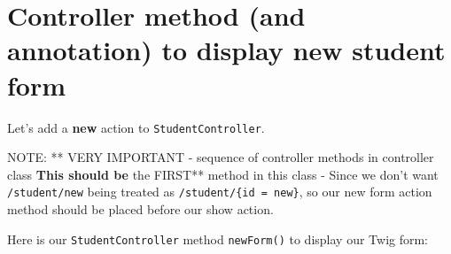 \documentclass[a4paperpaper,openright]{book}
\newenvironment{Shaded}{}{}
\newcommand{\CommentTok}[1]{\textcolor[rgb]{0.38,0.63,0.69}{\textit{#1}}}
\newcommand{\KeywordTok}[1]{\textcolor[rgb]{0.00,0.44,0.13}{\textbf{#1}}}
\newcommand{\NormalTok}[1]{#1}
\newcommand{\OtherTok}[1]{\textcolor[rgb]{0.00,0.44,0.13}{#1}}
\newcommand{\StringTok}[1]{\textcolor[rgb]{0.25,0.44,0.63}{#1}}
\begin{document}
\begin{Shaded}
\end{Shaded}

\hypertarget{controller-method-and-annotation-to-display-new-student-form}{%
\section{Controller method (and annotation) to display new student
form}\label{controller-method-and-annotation-to-display-new-student-form}}

Let's add a \textbf{new} action to \texttt{StudentController}.

NOTE: ** VERY IMPORTANT - sequence of controller methods in controller
class \textbf{ This should be }the FIRST** method in this class - Since
we don't want \texttt{/student/new} being treated as
\texttt{/student/\{id\ =\ \textquotesingle{}new\textquotesingle{}\}}, so
our new form action method should be placed before our show action.

Here is our \texttt{StudentController} method \texttt{newForm()} to
display our Twig form:

\begin{Shaded}
\end{Shaded}
\end{document}
